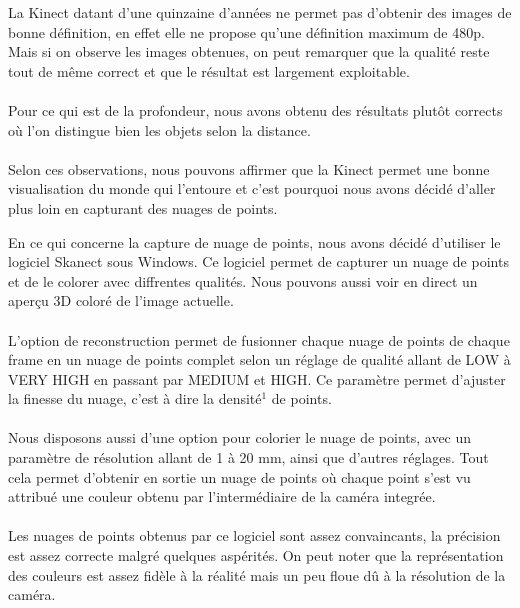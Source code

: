             \normalsize{
                La Kinect datant d'une quinzaine d'années ne permet pas d'obtenir des images de bonne définition, en effet elle ne propose qu'une définition maximum de 480p. Mais si on observe les images obtenues, on peut remarquer que la qualité reste tout de même correct et que le résultat est largement exploitable.
            }
            \\ \\
            \normalsize{
                Pour ce qui est de la profondeur, nous avons obtenu des résultats plutôt corrects où l'on distingue bien les objets selon la distance.
            }
            \\ \\
            \normalsize{
                Selon ces observations, nous pouvons affirmer que la Kinect permet une bonne visualisation du monde qui l'entoure et c'est pourquoi nous avons décidé d'aller plus loin en capturant des nuages de points.
            }
        

            \normalsize{
                En ce qui concerne la capture de nuage de points, nous avons décidé d'utiliser le logiciel Skanect sous Windows. Ce logiciel permet de capturer un nuage de points et de le colorer avec diffrentes qualités. Nous pouvons aussi voir en direct un aperçu 3D coloré de l'image actuelle.
            }
            \\ \\
            \normalsize{
                L'option de reconstruction permet de fusionner chaque nuage de points de chaque frame en un nuage de points complet selon un réglage de qualité allant de LOW à VERY HIGH en passant par MEDIUM et HIGH. Ce paramètre permet d'ajuster la finesse du nuage, c'est à dire la densité$^1$ de points.
            }
            \\ \\
            \normalsize{
                Nous disposons aussi d'une option pour colorier le nuage de points, avec un paramètre de résolution allant de 1 à 20 mm, ainsi que d'autres réglages. Tout cela permet d'obtenir en sortie un nuage de points où chaque point s'est vu attribué une couleur obtenu par l'intermédiaire de la caméra integrée.
            }
            \\ \\
            \normalsize{
                Les nuages de points obtenus par ce logiciel sont assez convaincants, la précision est assez correcte malgré quelques aspérités. On peut noter que la représentation des couleurs est assez fidèle à la réalité mais un peu floue dû à la résolution de la caméra.
            }
        
